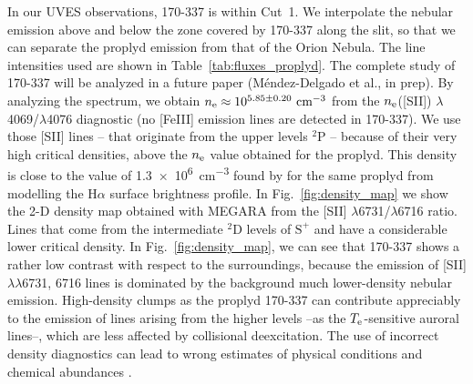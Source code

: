 \documentclass[fleqn,usenatbib]{mnras}
\newcommand*\chem[1]{\ensuremath{\mathrm{#1}}}
\begin{document}
In our UVES observations, 170-337 is within Cut~1. We interpolate the nebular emission above and below the zone covered by 170-337 along the slit, so that we can separate the proplyd emission from that of the Orion Nebula.
The line intensities used are shown in Table~\ref{tab:fluxes_proplyd}.
The complete study of 170-337 will be analyzed in a future paper (M\'endez-Delgado et al., in prep).
By analyzing the spectrum, we obtain  $n_{\rm e}\approx 10^{5.85 \pm 0.20} \text{ cm}^{-3}$ from the $n_{\rm e}$([S\thinspace II]) $\lambda$4069/$\lambda$4076 diagnostic (no [Fe\thinspace III] emission lines are detected in 170-337). We use those [S\thinspace II] lines -- that originate from the upper levels \chem{^2P} -- because of their very high critical densities, above the $n_{\rm e}$ value obtained for the proplyd.
This density is close to the value of \SI{1.3e6}{cm^{-3}}
found by \citet{henney99} for the same proplyd
from modelling the H\(\alpha\) surface brightness profile. 
In Fig.~\ref{fig:density_map} we show the 2-D density map obtained with MEGARA from the [S\thinspace II] $\lambda$6731/$\lambda$6716 ratio. Lines that come from the intermediate \chem{^2D} levels of \chem{S^{+}} and have a considerable lower critical density. In Fig.~\ref{fig:density_map}, we can see that 170-337 shows a rather low contrast with respect to the surroundings, because the emission of [S\thinspace II] $\lambda\lambda$6731, 6716 lines is dominated by the background much lower-density nebular emission. High-density clumps as the proplyd 170-337 can contribute appreciably to the emission of lines arising from the higher levels --as the $T_{\rm e}$-sensitive auroral lines--, which are less affected by collisional deexcitation. The use of incorrect density diagnostics can lead to wrong estimates of physical conditions and chemical abundances \citep[][]{mendez2021-2}. 
\end{document}
